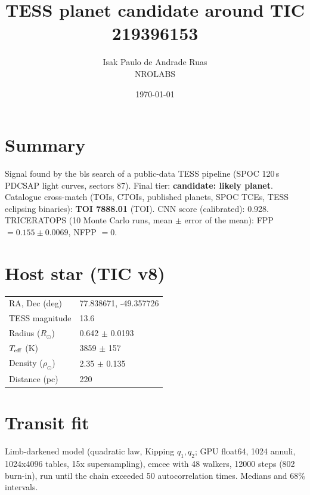 \documentclass[11pt,a4paper]{article}
\title{TESS planet candidate around TIC 219396153}
\author{Isak Paulo de Andrade Ruas \\ NROLABS}
\date{\today}
\begin{document}
\maketitle

\section*{Summary}
Signal found by the bls search of a public-data TESS pipeline
(SPOC 120\,s PDCSAP light curves, sectors 87).
Final tier: \textbf{candidate: likely planet}.
Catalogue cross-match (TOIs, CTOIs, published planets, SPOC TCEs, TESS eclipsing binaries):
\textbf{TOI 7888.01} (TOI).
CNN score (calibrated): 0.928.
TRICERATOPS (10 Monte Carlo runs, mean $\pm$ error of the mean):
FPP $= 0.155 \pm 0.0069$,
NFPP $= 0$.

\section*{Host star (TIC v8)}
\begin{tabular}{ll}\toprule
RA, Dec (deg) & 77.838671, -49.357726 \\
TESS magnitude & 13.6 \\
Radius ($R_\odot$) & 0.642 $\pm$ 0.0193 \\
$T_{\rm eff}$ (K) & 3859 $\pm$ 157 \\
Density ($\rho_\odot$) & 2.35 $\pm$ 0.135 \\
Distance (pc) & 220 \\\bottomrule
\end{tabular}

\section*{Transit fit}
Limb-darkened model (quadratic law, Kipping $q_1,q_2$; GPU float64, 1024 annuli, 1024x4096 tables, 15x supersampling), emcee with 48 walkers,
12000 steps (802 burn-in), run until the chain exceeded 50 autocorrelation times.
Medians and 68\% intervals.
\end{document}
